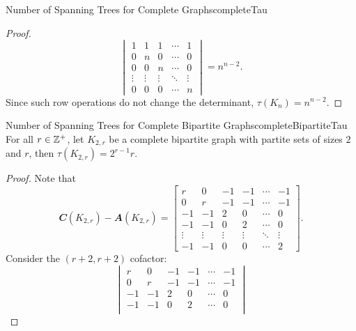\documentclass[math]{amznotes}
\theoremstyle{remark}
\begin{document}
\begin{probox}{Number of Spanning Trees for Complete Graphs}{completeTau}
\begin{proof}
        \begin{equation*}
            \begin{vmatrix}
                1 & 1 & 1 & \cdots & 1 \\
                0 & n & 0 & \cdots & 0 \\
                0 & 0 & n & \cdots & 0 \\
                \vdots & \vdots & \vdots & \ddots & \vdots \\
                0 & 0 & 0 & \cdots & n
            \end{vmatrix} = n^{n - 2}.
        \end{equation*}
        Since such row operations do not change the determinant, $\tau(K_n) = n^{n - 2}$.
    \end{proof}
\end{probox}
\begin{probox}{Number of Spanning Trees for Complete Bipartite Graphs}{completeBipartiteTau}
    For all $r \in \mathbb{Z}^+$, let $K_{2, r}$ be a complete bipartite graph with partite sets of sizes $2$ and $r$, then $\tau\left(K_{2, r}\right) = 2^{r - 1}r$.
    \tcblower
    \begin{proof}
        Note that
        \begin{equation*}
            \mathbfit{C}(K_{2, r}) - \mathbfit{A}(K_{2, r}) = \begin{bmatrix}
                r & 0 & -1 & -1 & \cdots & -1 \\
                0 & r & -1 & -1 & \cdots & -1 \\
                -1 & -1 & 2 & 0 & \cdots & 0 \\
                -1 & -1 & 0 & 2 & \cdots & 0 \\
                \vdots & \vdots & \vdots & \vdots & \ddots & \vdots \\
                -1 & -1 & 0 & 0 & \cdots & 2
            \end{bmatrix}.
        \end{equation*}
        Consider the $(r + 2, r + 2)$ cofactor:
        \begin{equation*}
            \begin{vmatrix}
                r & 0 & -1 & -1 & \cdots & -1 \\
                0 & r & -1 & -1 & \cdots & -1 \\
                -1 & -1 & 2 & 0 & \cdots & 0 \\
                -1 & -1 & 0 & 2 & \cdots & 0 \\

\end{vmatrix}
\end{equation*}
\end{proof}
\end{probox}
\end{document}
